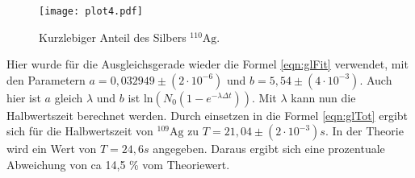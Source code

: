 \begin{figure}
  \centering
  \texttt{[image: plot4.pdf]}
  \caption{Kurzlebiger Anteil des Silbers $^{110}\text{Ag}$.}
  \label{fig:plot4}
\end{figure}
\FloatBarrier

Hier wurde für die Ausgleichsgerade wieder die Formel \ref{eqn:glFit} verwendet, mit den Parametern $a = 0,032949 \pm (2 \cdot 10^{-6})$ und $b = 5,54 \pm (4 \cdot 10^{-3})$.
Auch hier ist $a$ gleich $\lambda$ und $b$ ist $\text{ln}(N_0(1-e^{-\lambda \Delta t}))$.
Mit $\lambda$ kann nun die Halbwertszeit berechnet werden.
Durch einsetzen in die Formel \ref{eqn:glTot} ergibt sich für die Halbwertszeit von $^{109}\text{Ag}$ zu $T = 21,04 \pm (2 \cdot 10^{-3}) s$.
In der Theorie wird ein Wert von $T = 24,6 s$ \cite{Periode} angegeben.
Daraus ergibt sich eine prozentuale Abweichung von ca 14,5 \% vom Theoriewert.